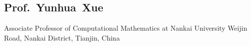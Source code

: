 \documentclass[11pt,a4paper, final]{moderncv}
\newcommand{\spacesubsection}{\vspace{0.2cm}}
\begin{document}
	\subsection{\textbf{Prof.~Yunhua~Xue}}
		\cvline{}
		{Associate Professor of Computational Mathematics at Nankai University}
		{Weijin Road, Nankai District, Tianjin, China}





\clearpage
\end{document}
